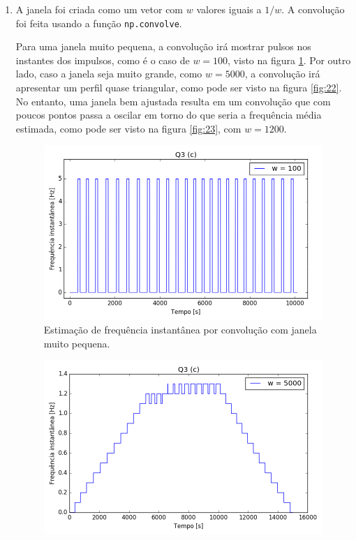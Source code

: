 \documentclass[12pt,letterpaper]{article}
\begin{document}
\begin{enumerate}[label=(\alph*)]
    \item A janela foi criada como um vetor com $w$ valores iguais a $1/w$. A convolução foi feita usando a função \lstinline{np.convolve}.
    
    Para uma janela muito pequena, a convolução irá mostrar pulsos nos instantes dos impulsos, como é o caso de $w = 100$, visto na figura \ref{fig:21}. Por outro lado, caso a janela seja muito grande, como $w = 5000$, a convolução irá apresentar um perfil quase triangular, como pode ser visto na figura \ref{fig:22}. No entanto, uma janela bem ajustada resulta em um convolução que com poucos pontos passa a oscilar em torno do que seria a frequência média estimada, como pode ser visto na figura \ref{fig:23}, com $w = 1200$.
        \begin{figure}[H]
            \centering
            \includegraphics[width=.9\textwidth]{TC1/images/Q3c_w_toosmall.png}
            \caption{Estimação de frequência instantânea por convolução com janela muito pequena.}
            \label{fig:21}
        \end{figure}
        \begin{figure}[H]
            \centering
            \includegraphics[width=.9\textwidth]{TC1/images/Q3c_w_toobig.png}

\end{figure}
\end{enumerate}
\end{document}
